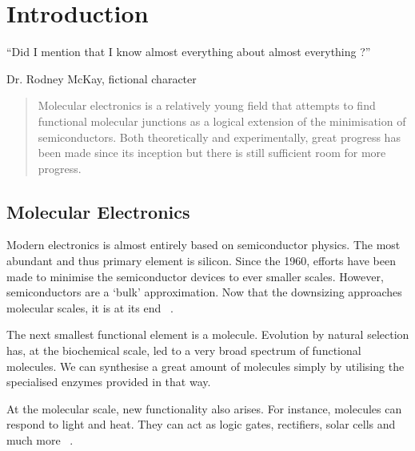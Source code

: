 \chapter{Introduction}
\label{ch:chapter_1}




\epigraph{
    “Did I mention that I know almost everything about almost everything ?”
}{Dr. Rodney McKay, fictional character}

\begin{abstract}
Molecular electronics is a relatively young field that attempts to find functional molecular junctions as a logical extension of the minimisation of semiconductors. Both theoretically and experimentally, great progress has been made since its inception but there is still sufficient room for more progress. 
\end{abstract}

\newpage
\section{Molecular Electronics}
Modern electronics is almost entirely based on semiconductor physics. The most abundant and thus primary element is silicon. Since the 1960, efforts have been made to minimise the semiconductor devices to ever smaller scales. However, semiconductors are a `bulk' approximation. Now that the downsizing approaches molecular scales, it is at its end ~\cite{seldenthuis}.

The next smallest functional element is a molecule. Evolution by natural selection has, at the biochemical scale, led to a very broad spectrum of functional molecules. We can synthesise a great amount of molecules simply by utilising the specialised enzymes provided in that way.

At the molecular scale, new functionality also arises. For instance, molecules can respond to light and heat. They can act as logic gates, rectifiers, solar cells and much more ~\cite{perrin}. 

